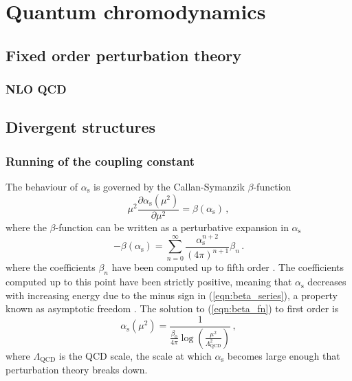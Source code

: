 \documentclass[main.tex]{subfiles}
\begin{document}
\chapter{Quantum chromodynamics}
\label{chapter:qcd}
\section{Fixed order perturbation theory}
\subsection{NLO QCD}
\section{Divergent structures}
\subsection{Running of the coupling constant}
The behaviour of $\alpha_{\mathrm{s}}$
    is governed by the Callan-Symanzik \cite{Callan:1970yg,Symanzik:1970rt}
    $\beta$-function
    \begin{equation}\label{eqn:beta_fn}
        \mu^{2} \dfrac{\partial \alpha_{\mathrm{s}}(\mu^{2})}{\partial \mu^{2}} = \beta(\alpha_{\mathrm{s}}) \, ,
    \end{equation}
    where the $\beta$-function can be written as a perturbative
    expansion in $\alpha_{\mathrm{s}}$
    \begin{equation}\label{eqn:beta_series}
        -\beta(\alpha_{\mathrm{s}}) = \sum_{n=0}^{\infty}\dfrac{\alpha_{\mathrm{s}}^{n+2}}{(4\pi)^{n+1}} \beta_{n}\, .
    \end{equation}
    where the coefficients $\beta_{n}$ have been computed
    up to fifth order \cite{Baikov:2016tgj,Luthe:2017ttg}.
    The coefficients computed up to this point have been
    strictly positive, meaning that $\alpha_{\mathrm{s}}$
    decreases with increasing energy due to the minus sign
    in (\ref{eqn:beta_series}), a property known as
    asymptotic freedom \cite{Gross:1973id,Politzer:1973fx}.
    The solution to (\ref{eqn:beta_fn}) to first order
    is
    \begin{equation}\label{eqn:1l_alpha}
        \alpha_{\mathrm{s}}(\mu^{2}) = \dfrac{1}{\frac{\beta_{0}}{4\pi}\log\left(\frac{\mu^{2}}{\Lambda_{\mathrm{QCD}}^{2}}\right)} \, ,
    \end{equation}
    where $\Lambda_{\mathrm{QCD}}$ is the QCD scale,
    the scale at which $\alpha_{\mathrm{s}}$ becomes
    large enough that perturbation theory breaks down.
\end{document}

